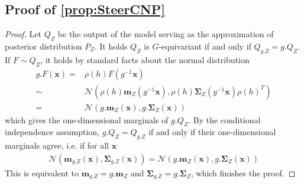 \subsection{Proof of \cref{prop:SteerCNP}}
\label{proof:SteerCNP}
\begin{proof}
	Let $Q_{Z}$ be the output of the model serving as the approximation of posterior distribution $P_{Z}$.
	It holds $Q_{Z}$ is $G$-equivariant if and only if $Q_{g.Z}=g.Q_{Z}$.
	\\
	If $F\sim Q_{Z}$, it holds by standard facts about the normal distribution
	\begin{align*}
		g.
		F(\mathbf{x})= & \rho(h)F(g^{-1}\mathbf{x}) \\ \sim&\mathcal{N}(\rho(h)\mathbf{m}_{Z}(g^{-1}\mathbf{x}),\rho(h)\mathbf{\Sigma}_{Z}(g^{-1}\mathbf{x})\rho(h)^T)\\ = & \mathcal{N}(g.
		   \mathbf{m}_{Z}(\mathbf{x}),g.\mathbf{\Sigma}_{Z}(\mathbf{x}))
	\end{align*}
	which gives the one-dimensional marginals of $g.
		Q_{Z}$.
	By the conditional independence assumption, $g.Q_{Z}=Q_{g.Z}$ if and only if their one-dimensional marginals agree, i.e. if for all $\mathbf{x}$ \begin{align*} \mathcal{N}(\mathbf{m}_{g.Z}(\mathbf{x}),\mathbf{\Sigma}_{g.Z}(\mathbf{x}))= \mathcal{N}(g.
		\mathbf{m}_{Z}(\mathbf{x}),g.\mathbf{\Sigma}_{Z}(\mathbf{x}))
	\end{align*}
	This is equivalent to $\mathbf{m}_{g.Z}=g.
		\mathbf{m}_{Z}$ and $\mathbf{\Sigma}_{g.
			Z}=g.
		\mathbf{\Sigma}_{Z}$, which finishes the proof.
\end{proof}

